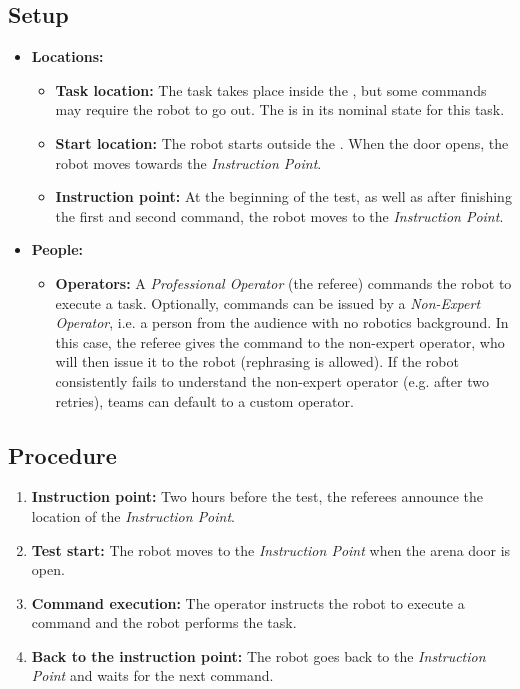 \subsection*{Setup}
\begin{itemize}[nosep]
    \item \textbf{Locations:}
        \begin{itemize}
            \item \textbf{Task location:} The task takes place inside the \Arena{}, but some commands may require the robot to go out. The \Arena{} is in its nominal state for this task.
            \item \textbf{Start location:} The robot starts outside the \Arena{}. When the door opens, the robot moves towards the \textit{Instruction Point}.
            \item \textbf{Instruction point:} At the beginning of the test, as well as after finishing the first and second command, the robot moves to the \textit{Instruction Point}.
        \end{itemize}
    \item \textbf{People:}
        \begin{itemize}
            \item \textbf{Operators:} A \emph{Professional Operator} (the referee) commands the robot to execute a task.
            Optionally, commands can be issued by a \emph{Non-Expert Operator}, i.e. a person from the audience with no robotics background.
            In this case, the referee gives the command to the non-expert operator, who will then issue it to the robot (rephrasing is allowed).
            If the robot consistently fails to understand the non-expert operator (e.g. after two retries), teams can default to a custom operator.
        \end{itemize}
\end{itemize}


\subsection*{Procedure}
\begin{enumerate}[nosep]
	\item \textbf{Instruction point:} Two hours before the test, the referees announce the location of the \textit{Instruction Point}.
	\item \textbf{Test start:} The robot moves to the \textit{Instruction Point} when the arena door is open.
	\item \textbf{Command execution:} The operator instructs the robot to execute a command and the robot performs the task.
	\item \textbf{Back to the instruction point:} The robot goes back to the \textit{Instruction Point} and waits for the next command.
\end{enumerate}


